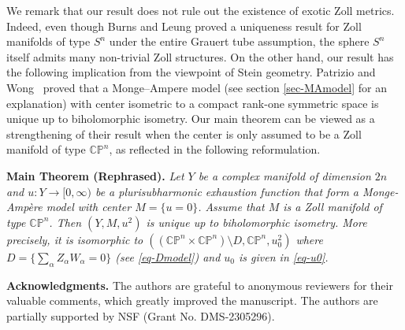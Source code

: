 \documentclass[a4paper, 12pt]{article}
\newcommand{\bCP}{\mathbb{CP}^n}
\begin{document}
We remark that our result does not rule out the existence of exotic Zoll metrics. Indeed,  even though Burns and Leung proved a uniqueness result for Zoll manifolds of type $S^n$ under the entire Grauert tube assumption, the sphere $S^n$ itself admits many non-trivial Zoll structures. On the other hand, our result has the following 
implication from the viewpoint of Stein geometry. Patrizio and Wong~\cite{PW91} proved that a Monge--Ampere model (see section \ref{sec-MAmodel} for an explanation) with center isometric to a compact rank-one symmetric space is unique up to biholomorphic isometry. Our main theorem can be viewed as a strengthening of their result when the center is only assumed to be a Zoll manifold of type $\bCP$, as reflected in the following reformulation.

\medskip
\noindent\textbf{Main Theorem (Rephrased).}
\textit{Let $Y$ be a complex manifold of dimension $2n$ and $u: Y\rightarrow [0, \infty)$ be a plurisubharmonic exhaustion function that form a Monge-Amp\`{e}re model with center $M=\{u=0\}$. Assume that $M$ is a Zoll manifold of type $\bCP$. Then $(Y,M,u^2)$ is unique up to biholomorphic isometry. More precisely, it is isomorphic to $\left((\mathbb{CP}^n\times \mathbb{CP}^n)\setminus D, \mathbb{CP}^n, u_0^2\right)$ where $D=\{\sum_\alpha Z_\alpha W_\alpha=0\}$ (see \eqref{eq-Dmodel}) and $u_0$ is given in \eqref{eq-u0}.} 




\vskip 3mm 

\noindent
\textbf{Acknowledgments.} The authors are grateful to anonymous reviewers for their valuable comments, which greatly improved the manuscript. The authors are partially supported by NSF (Grant No. DMS-2305296).
\end{document}
